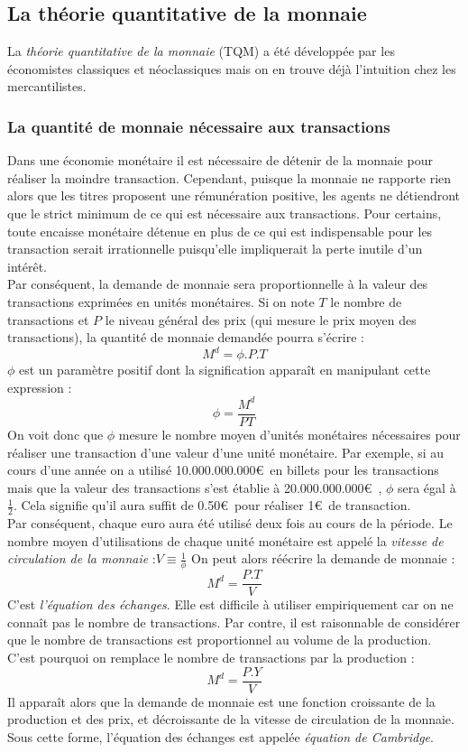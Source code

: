 \documentclass[10pt]{book}
\begin{document}
\subsection{La théorie quantitative de la monnaie}
La \textit{théorie quantitative de la monnaie} (TQM) a été développée par les économistes classiques et néoclassiques mais on en trouve déjà l'intuition chez les mercantilistes.
\subsubsection{La quantité de monnaie nécessaire aux transactions}
Dans une économie monétaire il est nécessaire de détenir de la monnaie pour réaliser la moindre transaction. Cependant, puisque la monnaie ne rapporte rien alors que les titres proposent une rémunération positive, les agents ne détiendront que le strict minimum de ce qui est nécessaire aux transactions. Pour certains, toute encaisse monétaire détenue en plus de ce qui est indispensable pour les transaction serait irrationnelle puisqu'elle impliquerait la perte inutile d'un intérêt. \\
Par conséquent, la demande de monnaie sera proportionnelle à la valeur des transactions exprimées en unités monétaires. Si on note $T$ le nombre de transactions et $P$ le niveau général des prix (qui mesure le prix moyen des transactions), la quantité de monnaie demandée pourra s'écrire :
$$M^d = \phi . P . T$$
$\phi$ est un paramètre positif dont la signification apparaît en manipulant cette expression :
$$\phi = \frac{M^d}{PT}$$
On voit donc que $\phi$ mesure le nombre moyen d'unités monétaires nécessaires pour réaliser une transaction d'une valeur d'une unité monétaire. Par exemple, si au cours d'une année on a utilisé 10.000.000.000\euro~en billets pour les transactions mais que la valeur des transactions s'est établie à 20.000.000.000\euro~, $\phi$ sera égal à $\frac{1}{2}$. Cela signifie qu'il aura suffit de 0.50\euro~pour réaliser 1\euro~de transaction. \\
Par conséquent, chaque euro aura été utilisé deux fois au cours de la période. Le nombre moyen d'utilisations de chaque unité monétaire est appelé la \textit{vitesse de circulation de la monnaie} :$ V \equiv \frac{1}{\phi}$
On peut alors réécrire la demande de monnaie :
$$M^d = \frac{P.T}{V}$$
C'est \textit{l'équation des échanges}. Elle est difficile à utiliser empiriquement car on ne connaît pas le nombre de transactions. Par contre, il est raisonnable de considérer que le nombre de transactions est proportionnel au volume de la production. C'est pourquoi on remplace le nombre de transactions par la production :
$$M^d = \frac{P.Y}{V}$$
Il apparaît alors que la demande de monnaie est une fonction croissante de la production et des prix, et décroissante de la vitesse de circulation de la monnaie. Sous cette forme, l'équation des échanges est appelée \textit{équation de Cambridge}.
\end{document}
